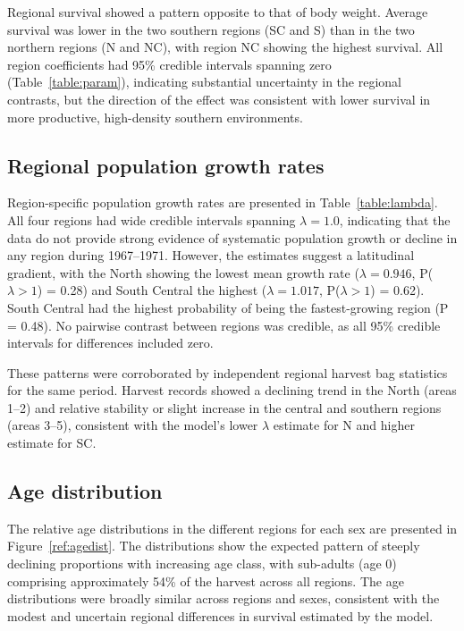 \documentclass[12pt,a4paper,final,abstract=true,headings=small]{scrartcl}
\begin{document}
Regional survival showed a pattern opposite to that of body weight. Average survival was lower in the two southern regions (SC and S) than in the two northern regions (N and NC), with region NC showing the highest survival. All region coefficients had 95\% credible intervals spanning zero (Table~\ref{table:param}), indicating substantial uncertainty in the regional contrasts, but the direction of the effect was consistent with lower survival in more productive, high-density southern environments.

\subsection*{Regional population growth rates}

Region-specific population growth rates are presented in Table~\ref{table:lambda}. All four regions had wide credible intervals spanning $\lambda = 1.0$, indicating that the data do not provide strong evidence of systematic population growth or decline in any region during 1967--1971. However, the estimates suggest a latitudinal gradient, with the North showing the lowest mean growth rate ($\lambda = 0.946$, P($\lambda > 1$) = 0.28) and South Central the highest ($\lambda = 1.017$, P($\lambda > 1$) = 0.62). South Central had the highest probability of being the fastest-growing region (P = 0.48). No pairwise contrast between regions was credible, as all 95\% credible intervals for differences included zero.

These patterns were corroborated by independent regional harvest bag statistics for the same period. Harvest records showed a declining trend in the North (areas 1--2) and relative stability or slight increase in the central and southern regions (areas 3--5), consistent with the model's lower $\lambda$ estimate for N and higher estimate for SC.

\subsection*{Age distribution}

The relative age distributions in the different regions for each sex are presented in Figure~\ref{ref:agedist}. The distributions show the expected pattern of steeply declining proportions with increasing age class, with sub-adults (age 0) comprising approximately 54\% of the harvest across all regions. The age distributions were broadly similar across regions and sexes, consistent with the modest and uncertain regional differences in survival estimated by the model.
\end{document}
